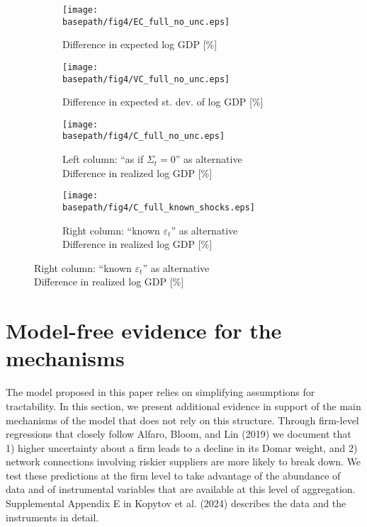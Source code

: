 \documentclass[11pt]{article}
\theoremstyle{definition}
\newcommand{\basepath}{F:/12004835/replication_package_final/replication_package_final/output_figures}
\begin{document}
	\begin{figure}[ht]
		\caption{The role of uncertainty in the postwar period.\\ First row: ``as if $\Sigma_t = 0$'' as the alternative}
		\centering
		\begin{subfigure}[b]{0.48\textwidth} 
			\texttt{[image: \\basepath/fig4/EC\_full\_no\_unc.eps]}
			\caption{Difference in expected log GDP [\%]}
			\label{fig:4-a}
		\end{subfigure}
		\hfill
		\begin{subfigure}[b]{0.48\textwidth}
			\texttt{[image: \\basepath/fig4/VC\_full\_no\_unc.eps]}
			\caption{Difference in expected st. dev. of log GDP [\%]}
			\label{fig:4-b}
		\end{subfigure}

		\begin{subfigure}[b]{0.48\textwidth}
			\caption{Left column: ``as if $\Sigma_t = 0$'' as alternative\\ Difference in realized log GDP [\%]}
			\texttt{[image: \\basepath/fig4/C\_full\_no\_unc.eps]}
			\label{fig:4-c}
		\end{subfigure}
		\hfill
		\begin{subfigure}[b]{0.48\textwidth} 
			\caption{Right column: ``known $\varepsilon_t$'' as alternative\\ Difference in realized log GDP [\%]}
			\texttt{[image: \\basepath/fig4/C\_full\_known\_shocks.eps]}
			\label{fig:4-d}
		\end{subfigure}
		\label{fig:4}
	\end{figure}
	
	\newpage
	\section{Model-free evidence for the mechanisms}
	The model proposed in this paper relies on simplifying assumptions for tractability. In this section, we present additional evidence in support of the main mechanisms of the model that does not rely on this structure. Through firm-level regressions that closely follow Alfaro, Bloom, and Lin (2019) we document that 1) higher uncertainty about a firm leads to a decline in its Domar weight, and 2) network connections involving riskier suppliers are more likely to break down. We test these predictions at the firm level to take advantage of the abundance of data and of instrumental variables that are available at this level of aggregation. Supplemental Appendix E in Kopytov et al. (2024) describes the data and the instruments in detail.
	
\end{document}
